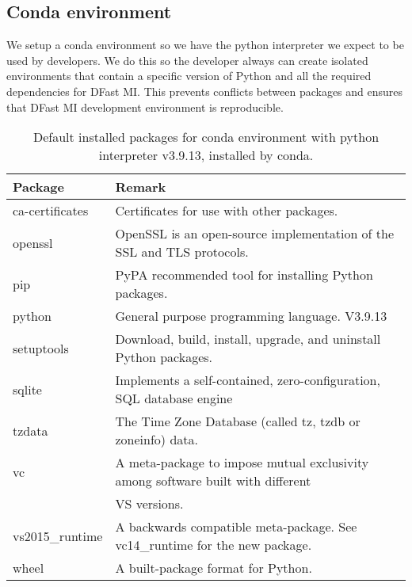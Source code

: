 \subsection{Conda environment}
We setup a conda environment so we have the python interpreter we expect to be used by developers.
We do this so the developer always can create isolated environments that contain a specific version of Python and all the required dependencies for DFast MI. This prevents conflicts between packages and ensures that DFast MI development environment is reproducible.
\begin{table}[]
	\caption{Default installed packages for conda environment with python interpreter v3.9.13, installed by conda.}
	\begin{tabular}{|l|l|}
		\hline
		\textbf{Package}    & \textbf{Remark} \\ \hline
		ca-certificates     & Certificates for use with other packages.\\ \hline
		openssl             & OpenSSL is an open-source implementation of the SSL and TLS protocols. \\ \hline
		pip                 & PyPA recommended tool for installing Python packages. \\ \hline
		python              & General purpose programming language. V3.9.13 \\ \hline
		setuptools          & Download, build, install, upgrade, and uninstall Python packages. \\ \hline
		sqlite              & Implements a self-contained, zero-configuration, SQL database engine \\ \hline
		tzdata              & The Time Zone Database (called tz, tzdb or zoneinfo) data. \\ \hline
		vc                  & A meta-package to impose mutual exclusivity among software built with different
		\\ & VS versions. \\ \hline
		vs2015\_runtime     & A backwards compatible meta-package. See vc14\_runtime for the new package. \\ \hline
		wheel               & A built-package format for Python. \\ \hline
	\end{tabular}
\end{table}

